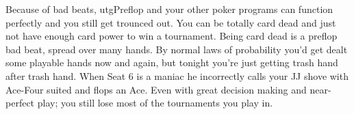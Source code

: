 Because of bad beats, utgPreflop and your other poker programs can
function perfectly and you still get trounced out. You can be totally
card dead and just not have enough card power to win a
tournament. Being card dead is a preflop bad beat,
spread over many hands. By normal laws of probability you'd get dealt
some playable hands now and again, but tonight you're just getting
trash hand after trash hand. When Seat 6 is a maniac he incorrectly
calls your JJ shove with Ace-Four suited and flops an Ace. Even with
great decision making and near-perfect play; you still lose most of
the tournaments you play in.

